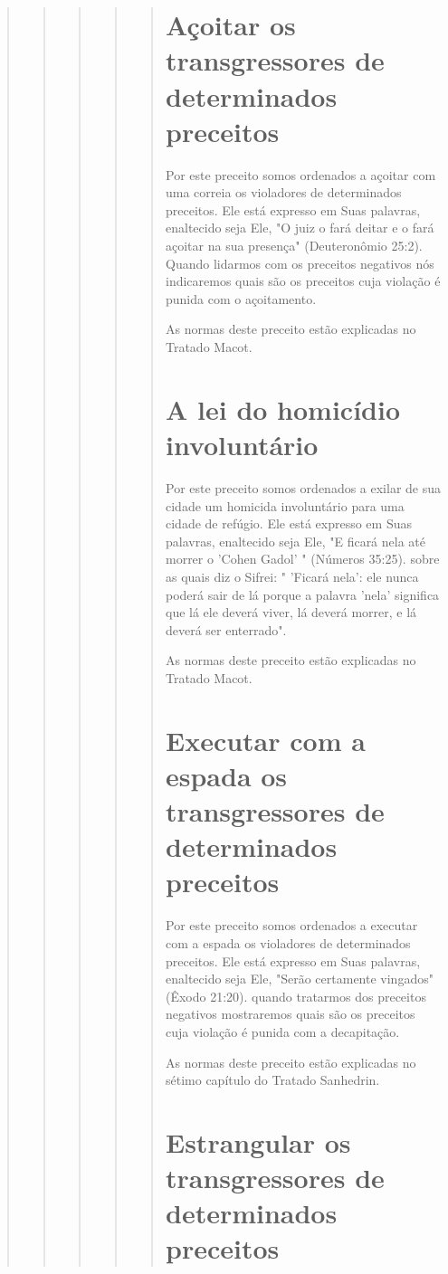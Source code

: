 \begin{quote}
\begin{quote}
\begin{quote}
\begin{quote}
\begin{quote}
\section{Açoitar os transgressores de determinados preceitos}

Por este preceito somos ordenados a açoitar com uma correia os
vio­ladores de determinados preceitos. Ele está expresso em Suas
palavras, enalte­cido seja Ele, "O juiz o fará deitar e o fará açoitar
na sua presença" (Deuteronô­mio 25:2). Quando lidarmos com os preceitos
negativos nós indicaremos quais são os preceitos cuja violação é punida
com o açoitamento.

As normas deste preceito estão explicadas no Tratado Macot.

\section{A lei do homicídio involuntário}

Por este preceito somos ordenados a exilar de sua cidade um homi­cida
involuntário para uma cidade de refúgio. Ele está expresso em Suas
pala­vras, enaltecido seja Ele, "E ficará nela até morrer o 'Cohen
Gadol' " (Números 35:25). sobre as quais diz o Sifrei: " 'Ficará nela':
ele nunca poderá sair de lá porque a palavra 'nela' significa que lá ele
deverá viver, lá deverá morrer, e lá deverá ser enterrado".

As normas deste preceito estão explicadas no Tratado Macot.

\section{Executar com a espada os transgressores de determinados preceitos}

Por este preceito somos ordenados a executar com a espada os vio­ladores
de determinados preceitos. Ele está expresso em Suas palavras,
enalte­cido seja Ele, "Serão certamente vingados" (Êxodo 21:20). quando
tratarmos dos preceitos negativos mostraremos quais são os preceitos
cuja violação é pu­nida com a decapitação.

As normas deste preceito estão explicadas no sétimo capítulo do Tra­tado
Sanhedrin.

\section{Estrangular os transgressores de determinados preceitos}


\end{quote}
\end{quote}
\end{quote}
\end{quote}
\end{quote}

